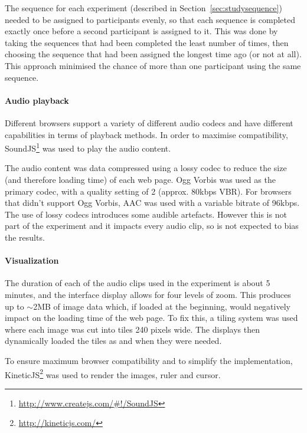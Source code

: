 The sequence for each experiment (described in Section~\ref{sec:studysequence})
needed to be assigned to participants evenly, so that each sequence is
completed exactly once before a second participant is assigned to it. This was
done by taking the sequences that had been completed the least number of times,
then choosing the sequence that had been assigned the longest time ago (or not
at all). This approach minimised the chance of more than one participant using
the same sequence. 

\paragraph{Audio playback}
Different browsers support a variety of different audio codecs and have
different capabilities in terms of playback methods. In order to maximise
compatibility, SoundJS\footnote{\url{http://www.createjs.com/\#!/SoundJS}} was
used to play the audio content.

The audio content was data compressed using a lossy codec to reduce the size
(and therefore loading time) of each web page. Ogg Vorbis was used as the
primary codec, with a quality setting of 2 (approx. 80kbps VBR). For browsers
that didn't support Ogg Vorbis, AAC was used with a variable bitrate of 96kbps.
The use of lossy codecs introduces some audible artefacts. However this is not
part of the experiment and it impacts every audio clip, so is not expected to
bias the results. 

\paragraph{Visualization}
The duration of each of the audio clips used in the experiment is about 5
minutes, and the interface display allows for four levels of zoom. This
produces up to $\sim$2MB of image data which, if loaded at the beginning, would
negatively impact on the loading time of the web page. To fix this, a tiling
system was used where each image was cut into tiles 240 pixels wide. The
displays then dynamically loaded the tiles as and when they were needed.

To ensure maximum browser compatibility and to simplify the implementation,
KineticJS\footnote{\url{http://kineticjs.com/}} was used to render the images,
ruler and cursor.

